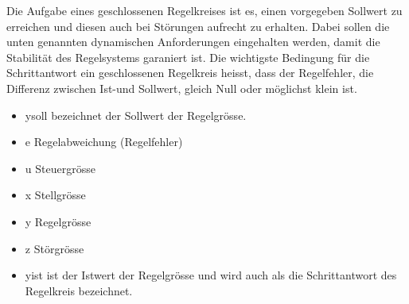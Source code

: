 

Die Aufgabe eines geschlossenen Regelkreises ist es, einen vorgegeben Sollwert zu erreichen und diesen auch bei Störungen aufrecht zu erhalten. Dabei sollen die unten genannten dynamischen Anforderungen eingehalten werden, damit die Stabilität des Regelsystems garaniert ist. Die wichtigste Bedingung für die Schrittantwort ein geschlossenen Regelkreis heisst, dass der Regelfehler, die Differenz zwischen Ist-und Sollwert, gleich Null oder möglichst klein ist.\\



\begin{itemize}
\item ysoll bezeichnet der Sollwert der Regelgrösse.
\item e Regelabweichung (Regelfehler) 
\item u Steuergrösse
\item x Stellgrösse
\item y Regelgrösse
\item z Störgrösse
\item yist ist der Istwert der Regelgrösse und wird auch als die Schrittantwort des Regelkreis bezeichnet.
\end{itemize}


